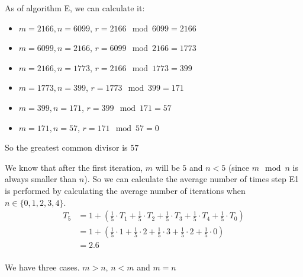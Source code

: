\label{ex:section1.1-4}
As of algorithm E, we can calculate it:
\begin{itemize}
    \item $m = 2166, n = 6099$, $r = 2166 \mod 6099 = 2166$
    \item $m = 6099, n = 2166$, $r = 6099 \mod 2166 = 1773$
    \item $m = 2166, n = 1773$, $r = 2166 \mod 1773 = 399$
    \item $m = 1773, n = 399$, $r = 1773 \mod 399 = 171$
    \item $m = 399, n = 171$, $r = 399 \mod 171 = 57$
    \item $m = 171, n = 57$, $r = 171 \mod 57 = 0$
\end{itemize}
So the greatest common divisor is $57$

\label{ex:section1.1-5}

\label{ex:section1.1-6}
We know that after the first iteration, $m$ will be $5$ and $n < 5$ (since $m \mod n$ is always smaller than $n$). So we can calculate the average number of times step E1 is performed by calculating the average number of iterations when $n \in \{0,1,2,3,4\}$.
\begin{align*}
    T_5 & = 1 + \left(\frac{1}{5} \cdot T_1 + \frac{1}{5} \cdot T_2 + \frac{1}{5} \cdot T_3 + \frac{1}{5} \cdot T_4 + \frac{1}{5} \cdot T_0 \right) \\
        & = 1 + \left(\frac{1}{5} \cdot 1 +   \frac{1}{5} \cdot 2 +   \frac{1}{5} \cdot 3 +   \frac{1}{5} \cdot 2   + \frac{1}{5} \cdot 0\right)    \\
        & = 2.6                                                                                                                                     \\
\end{align*}

\label{ex:section1.1-7}
We have three cases. $m > n$,  $n < m$ and $m = n$ \\

